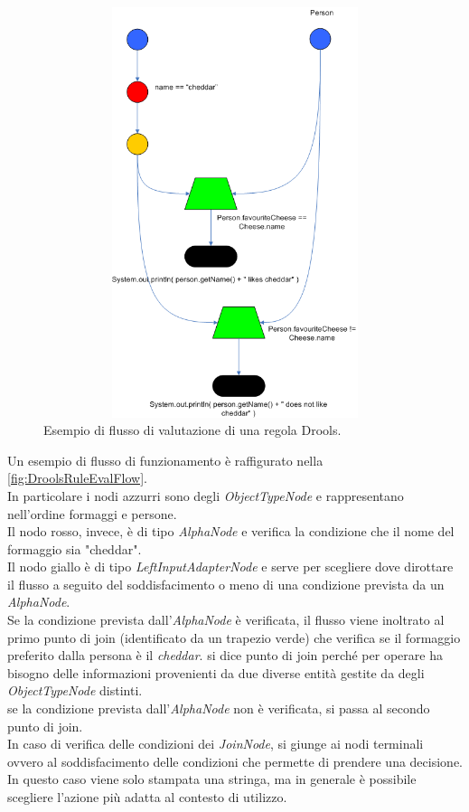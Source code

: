  	
 	\begin{figure}[H]
 		\begin{center}
 			\includegraphics[width=12cm,height=12cm,keepaspectratio]{Pics/drools_rule_flow_example.png}
 			\caption{Esempio di flusso di valutazione di una regola Drools.}
 			\label{fig:DroolsRuleEvalFlow}
 		\end{center}
 	\end{figure}
 	
 	Un esempio di flusso di funzionamento è raffigurato nella \autoref{fig:DroolsRuleEvalFlow}. \\
 	In particolare i nodi azzurri sono degli \textit{ObjectTypeNode} e rappresentano nell'ordine formaggi e persone. \\
 	Il nodo rosso, invece, è di tipo \textit{AlphaNode} e verifica la condizione che il nome del formaggio sia "cheddar". \\
 	Il nodo giallo è di tipo \textit{LeftInputAdapterNode} e serve per scegliere dove dirottare il flusso a seguito del soddisfacimento o meno di una condizione prevista da un \textit{AlphaNode}.\\
 	Se la condizione prevista dall'\textit{AlphaNode} è verificata, il flusso viene inoltrato al primo punto di join (identificato da un trapezio verde) che verifica se il formaggio preferito dalla persona è il \textit{cheddar}. si dice punto di join perché per operare ha bisogno delle informazioni provenienti da due diverse entità gestite da degli \textit{ObjectTypeNode} distinti. \\ se la condizione prevista dall'\textit{AlphaNode} non è verificata, si passa al secondo punto di join.\\
 	In caso di verifica delle condizioni dei \textit{JoinNode}, si giunge ai nodi terminali ovvero al soddisfacimento delle condizioni che permette di prendere una decisione. In questo caso viene solo stampata una stringa, ma in generale è possibile scegliere l'azione più adatta al contesto di utilizzo.
 	
